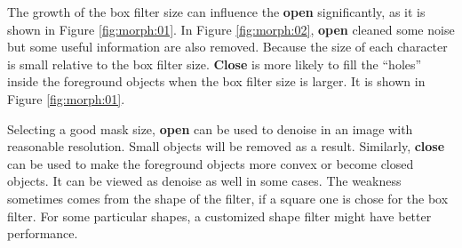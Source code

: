 \documentclass[paper=a4, fontsize=11pt]{scrartcl}
\numberwithin{equation}{section}		%
\numberwithin{figure}{section}			%
\numberwithin{table}{section}				%
\begin{document}
The growth of the box filter size can influence the \textbf{open} significantly, as it is shown in Figure \ref{fig:morph:01}.
In Figure \ref{fig:morph:02}, \textbf{open} cleaned some noise but some useful information are also removed.
Because the size of each character is small relative to the box filter size.
\textbf{Close} is more likely to fill the ``holes'' inside the foreground objects when the box filter size is larger.
It is shown in Figure \ref{fig:morph:01}.

Selecting a good mask size, \textbf{open} can be used to denoise in an image with reasonable resolution.
Small objects will be removed as a result.
Similarly, \textbf{close} can be used to make the foreground objects more convex or become closed objects.
It can be viewed as denoise as well in some cases.
The weakness sometimes comes from the shape of the filter, if a square one is chose for the box filter.
For some particular shapes, a customized shape filter might have better performance.
\end{document}
